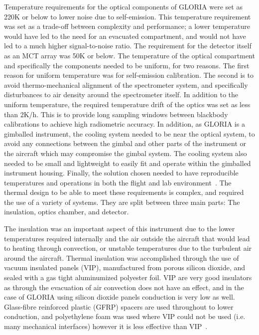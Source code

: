 Temperature requirements for the optical components of GLORIA were set as 220K or below to lower noise due to self-emission. This temperature requirement was set as a trade-off between complexity and performance; a lower temperature would have led to the need for an evacuated compartment, and would not have led to a much higher signal-to-noise ratio. The requirement for the detector itself as an MCT array was 50K or below. The temperature of the optical compartment and specifically the components needed to be uniform, for two reasons. The first reason for uniform temperature was for self-emission calibration. The second is to avoid thermo-mechanical alignment of the spectrometer system, and specifically disturbances to air density around the spectrometer itself. In addition to the uniform temperature, the required temperature drift of the optics was set as less than 2K/h. This is to provide long sampling windows between blackbody calibrations to achieve high radiometric accuracy. In addition, as GLORIA is a gimballed instrument, the cooling system needed to be near the optical system, to avoid any connections between the gimbal and other parts of the instrument or the aircraft which may compromise the gimbal system. The cooling system also needed to be small and lightweight to easily fit and operate within the gimballed instrument housing. Finally, the solution chosen needed to have reproducible temperatures and operations in both the flight and lab environment~\citep{GLORIA_thermalmech}. The thermal design to be able to meet these requirements is complex, and required the use of a variety of systems. They are split between three main parts: The insulation, optics chamber, and detector.

The insulation was an important aspect of this instrument due to the lower temperatures required internally and the air outside the aircraft that would lead to heating through convection, or unstable temperatures due to the turbulent air around the aircraft. Thermal insulation was accomplished through the use of vacuum insulated panels (VIP), manufactured from porous silicon dioxide, and sealed with a gas tight aluminumized polyester foil. VIP are very good insulators as through the evacuation of air convection does not have an effect, and in the case of GLORIA using silicon dioxide panels conduction is very low as well. Glass-fibre reinforced plastic (GFRP) spacers are used throughout to lower conduction, and polyethylene foam was used where VIP could not be used (i.e. many mechanical interfaces) however it is less effective than VIP~\citep{GLORIA_thermalmech}.

